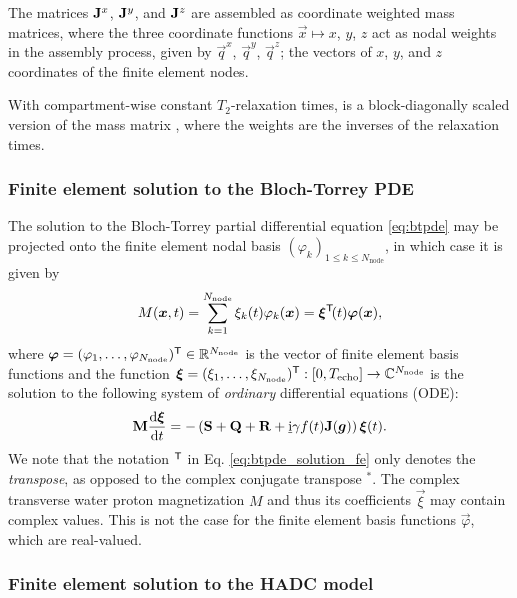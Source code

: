 \documentclass[a4paper]{article}
\begin{document}
The matrices $\mathbf{J}^x$, $\mathbf{J}^y$, and $\mathbf{J}^z$ are assembled as coordinate weighted mass matrices, where the three coordinate functions $\vec{x} \mapsto x$, $y$, $z$ act as nodal weights in the assembly process, given by $\vec{q}^x$, $\vec{q}^y$, $\vec{q}^z$; the vectors of $x$, $y$, and $z$ coordinates of the finite element nodes.

With compartment-wise constant $T_2$-relaxation times,  is a block-diagonally scaled version of the mass matrix , where the weights are the inverses of the relaxation times.



\subsubsection{Finite element solution to the Bloch-Torrey PDE}

The solution to the Bloch-Torrey partial differential equation \eqref{eq:btpde} may be projected onto the finite element nodal basis $(\varphi_k)_{1\leq k\leq N_\text{node}}$, in which case it is given by
\begin{equation}\label{eq:btpde_solution_fe}
    M(\bm{x},t) = \sum_{k = 1}^{N_\text{node}} \xi_k(t)\varphi_k(\bm{x}) = \bm{\xi}^{\mathsf{T}}\!(t) \bm{\varphi}(\bm{x}),
\end{equation}
where $\bm{\varphi} = (\varphi_1,\dots,\varphi_{N_\text{node}})^{\mathsf{T}} \in \mathbb{R}^{N_\text{node}}$ is the vector of finite element basis functions and the function $\bm{\xi} = (\xi_1, \dots, \xi_{N_\text{node}})^{\mathsf{T}} : [0, T_\text{echo}] \to \mathbb{C}^{N_\text{node}}$ is the solution to the following system of \emph{ordinary} differential equations (ODE):
\begin{equation}
    \mathbf{M} \frac{\mathrm{d} \bm{\xi}}{\mathrm{d} t} = - \left(\mathbf{S} + \mathbf{Q} + \mathbf{R} + \underline{\mathrm{i}} \gamma f(t) \mathbf{J}(\bm{g})\right)\bm{\xi}(t).
\end{equation}
We note that the notation $^{\mathsf{T}}$ in Eq. \eqref{eq:btpde_solution_fe} only denotes the \emph{transpose}, as opposed to the complex conjugate transpose $^*$. The complex transverse water proton magnetization $M$ and thus its coefficients $\vec{\xi}$ may contain complex values. This is not the case for the finite element basis functions $\vec{\varphi}$, which are real-valued.


\subsubsection{Finite element solution to the HADC model}
\end{document}
